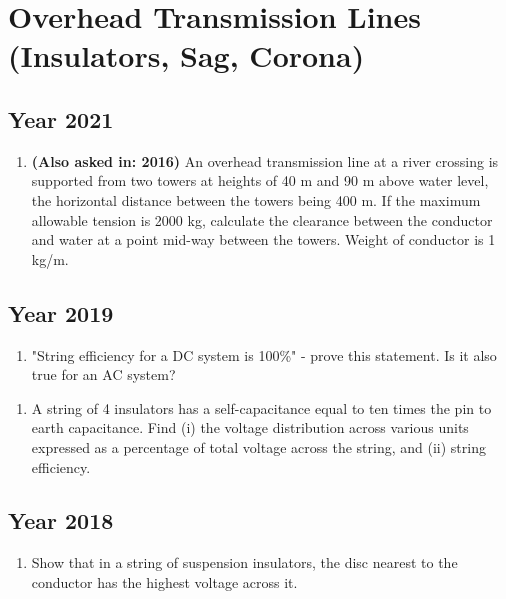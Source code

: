 \documentclass[12pt, a4paper]{article}
\begin{document}
	\section{Overhead Transmission Lines (Insulators, Sag, Corona)}
	
	\subsection{Year 2021}
	\begin{enumerate}[label=\textbf{Q5(c).}, wide, labelindent=0pt]
		\item \textbf{(Also asked in: 2016)} An overhead transmission line at a river crossing is supported from two towers at heights of 40 m and 90 m above water level, the horizontal distance between the towers being 400 m. If the maximum allowable tension is 2000 kg, calculate the clearance between the conductor and water at a point mid-way between the towers. Weight of conductor is 1 kg/m.
	\end{enumerate}
	
	\subsection{Year 2019}
	\begin{enumerate}[label=\textbf{Q1(a).}, wide, labelindent=0pt]
		\item "String efficiency for a DC system is 100\%" - prove this statement. Is it also true for an AC system?
	\end{enumerate}
	\begin{enumerate}[label=\textbf{Q1(b).}, wide, labelindent=0pt]
		\item A string of 4 insulators has a self-capacitance equal to ten times the pin to earth capacitance. Find (i) the voltage distribution across various units expressed as a percentage of total voltage across the string, and (ii) string efficiency.
	\end{enumerate}
	
	\subsection{Year 2018}
	\begin{enumerate}[label=\textbf{Q1(b).}, wide, labelindent=0pt]
		\item Show that in a string of suspension insulators, the disc nearest to the conductor has the highest voltage across it.
	\end{enumerate}
	
\end{document}
